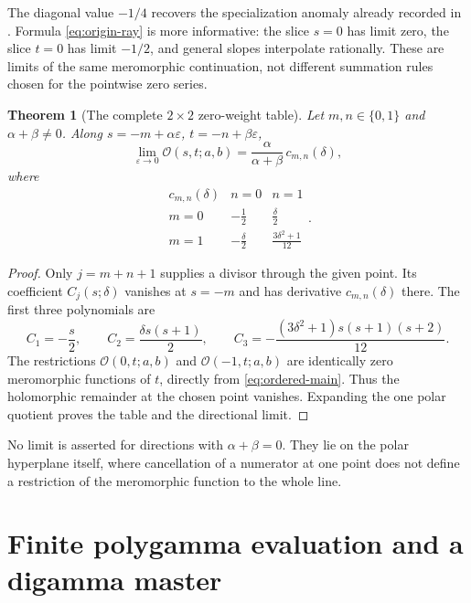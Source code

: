 \documentclass[11pt,a4paper]{article}
\numberwithin{equation}{section}
\newtheorem{theorem}{Theorem}[section]
\theoremstyle{definition}
\theoremstyle{remark}
\newcommand{\Ord}{\mathcal O}
\begin{document}
The diagonal value $-1/4$ recovers the specialization anomaly already
recorded in \cite{repo:finite}. Formula \eqref{eq:origin-ray} is more
informative: the slice $s=0$ has limit zero, the slice $t=0$ has limit
$-1/2$, and general slopes interpolate rationally. These are limits
of the same meromorphic continuation, not different summation rules
chosen for the pointwise zero series.

\begin{theorem}[The complete $2\times2$ zero-weight table]\label{thm:zero-table}
Let $m,n\in\{0,1\}$ and $\alpha+\beta\ne0$. Along
$s=-m+\alpha\varepsilon$, $t=-n+\beta\varepsilon$,
\begin{equation}\label{eq:zero-ray}
 \lim_{\varepsilon\to0}\Ord(s,t;a,b)
       =\frac{\alpha}{\alpha+\beta}\,c_{m,n}(\delta),
\end{equation}
where
\begin{equation}\label{eq:zero-table}
 \begin{array}{c|cc}
 c_{m,n}(\delta)&n=0&n=1\\\hline
 m=0&-\tfrac12&\tfrac{\delta}{2}\\[2pt]
 m=1&-\tfrac{\delta}{2}&\tfrac{3\delta^2+1}{12}
 \end{array}.
\end{equation}
\end{theorem}
\begin{proof}
Only $j=m+n+1$ supplies a divisor through the given point.
Its coefficient $C_j(s;\delta)$ vanishes at $s=-m$ and has
derivative $c_{m,n}(\delta)$ there. The first three polynomials are
\[
 C_1=-\frac s2,\qquad
 C_2=\frac{\delta s(s+1)}2,\qquad
 C_3=-\frac{(3\delta^2+1)s(s+1)(s+2)}{12}.
\]
The restrictions $\Ord(0,t;a,b)$ and $\Ord(-1,t;a,b)$ are
identically zero meromorphic functions of $t$, directly from
\eqref{eq:ordered-main}. Thus the holomorphic remainder at the
chosen point vanishes. Expanding the one polar quotient proves
the table and the directional limit.
\end{proof}

No limit is asserted for directions with $\alpha+\beta=0$.
They lie on the polar hyperplane itself, where cancellation of a
numerator at one point does not define a restriction of the
meromorphic function to the whole line.

\section{Finite polygamma evaluation and a digamma master}
\label{sec:integer}
\end{document}
